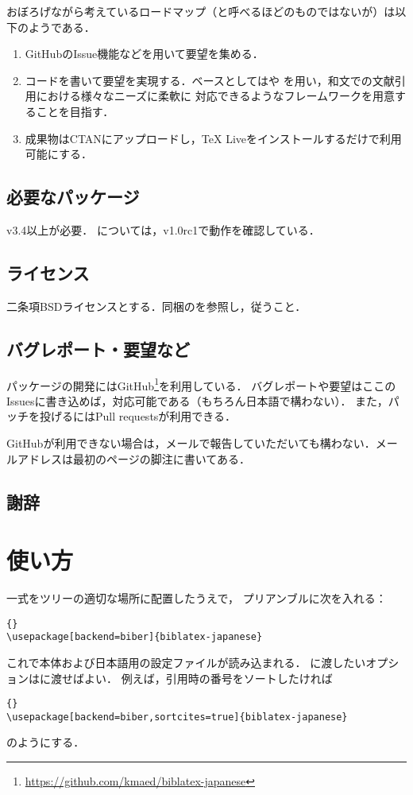\documentclass[lualatex,ja=standard,magstyle=real]{bxjsarticle}
\begin{document}
おぼろげながら考えているロードマップ（と呼べるほどのものではないが）は以下のようである．
\begin{enumerate}
\item GitHubのIssue機能などを用いて要望を集める．
\item コードを書いて要望を実現する．ベースとしてはや
  を用い，和文での文献引用における様々なニーズに柔軟に
  対応できるようなフレームワークを用意することを目指す．
\item 成果物はCTANにアップロードし，\TeX{} Liveをインストールするだけで利用可能にする．
\end{enumerate}

\subsection{必要なパッケージ}
 v3.4以上が必要．
については，v1.0rc1で動作を確認している．

\subsection{ライセンス}
二条項BSDライセンスとする．同梱のを参照し，従うこと．

\subsection{バグレポート・要望など}
パッケージの開発にはGitHub\footnote{\url{https://github.com/kmaed/biblatex-japanese}}を利用している．
バグレポートや要望はここのIssuesに書き込めば，対応可能である（もちろん日本語で構わない）．
また，パッチを投げるにはPull requestsが利用できる．

GitHubが利用できない場合は，メールで報告していただいても構わない．メールアドレスは最初のページの脚注に書いてある．

\subsection{謝辞}


\section{使い方}
一式をツリーの適切な場所に配置したうえで，
プリアンブルに次を入れる：
\begin{lstlisting}[style=latex]{}
\usepackage[backend=biber]{biblatex-japanese}
\end{lstlisting}
これで本体および日本語用の設定ファイルが読み込まれる．
に渡したいオプションはに渡せばよい．
例えば，引用時の番号をソートしたければ
\begin{lstlisting}[style=latex]{}
\usepackage[backend=biber,sortcites=true]{biblatex-japanese}
\end{lstlisting}
のようにする．
\end{document}
